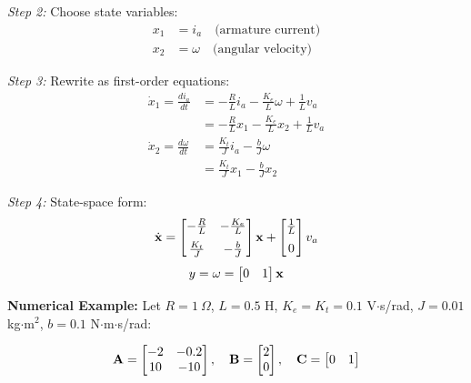 \textit{Step 2:} Choose state variables:
\begin{align}
    x_1 &= i_a \quad \text{(armature current)} \\
    x_2 &= \omega \quad \text{(angular velocity)}
\end{align}

\textit{Step 3:} Rewrite as first-order equations:
\begin{align}
    \dot{x}_1 = \frac{di_a}{dt} &= -\frac{R}{L}i_a - \frac{K_e}{L}\omega + \frac{1}{L}v_a \\
    &= -\frac{R}{L}x_1 - \frac{K_e}{L}x_2 + \frac{1}{L}v_a \\
    \dot{x}_2 = \frac{d\omega}{dt} &= \frac{K_t}{J}i_a - \frac{b}{J}\omega \\
    &= \frac{K_t}{J}x_1 - \frac{b}{J}x_2
\end{align}

\textit{Step 4:} State-space form:
\begin{equation}
    \dot{\mathbf{x}} = \begin{bmatrix} -\frac{R}{L} & -\frac{K_e}{L} \\[6pt] \frac{K_t}{J} & -\frac{b}{J} \end{bmatrix} \mathbf{x} +
    \begin{bmatrix} \frac{1}{L} \\[6pt] 0 \end{bmatrix} v_a
\end{equation}
\begin{equation}
    y = \omega = \begin{bmatrix} 0 & 1 \end{bmatrix} \mathbf{x}
\end{equation}

\textbf{Numerical Example:} Let $R = 1\ \Omega$, $L = 0.5$ H, $K_e = K_t = 0.1$ V$\cdot$s/rad, $J = 0.01$ kg$\cdot$m$^2$, $b = 0.1$ N$\cdot$m$\cdot$s/rad:

\begin{equation}
    \mathbf{A} = \begin{bmatrix} -2 & -0.2 \\ 10 & -10 \end{bmatrix}, \quad
    \mathbf{B} = \begin{bmatrix} 2 \\ 0 \end{bmatrix}, \quad
    \mathbf{C} = \begin{bmatrix} 0 & 1 \end{bmatrix}
\end{equation}

